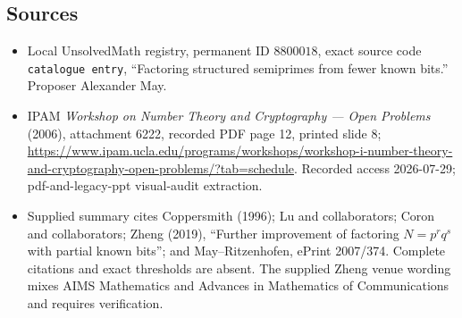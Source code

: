 \documentclass[11pt]{article}
\begin{document}
\subsection{Sources}
\begin{itemize}
\item Local UnsolvedMath registry, permanent ID \(8800018\), exact source code \texttt{catalogue entry}, ``Factoring structured semiprimes from fewer known bits.'' Proposer Alexander May.
\item IPAM \emph{Workshop on Number Theory and Cryptography --- Open Problems} (2006), attachment 6222, recorded PDF page 12, printed slide 8; \url{https://www.ipam.ucla.edu/programs/workshops/workshop-i-number-theory-and-cryptography-open-problems/?tab=schedule}. Recorded access 2026-07-29; pdf-and-legacy-ppt visual-audit extraction.
\item Supplied summary cites Coppersmith (1996); Lu and collaborators; Coron and collaborators; Zheng (2019), ``Further improvement of factoring \(N=p^rq^s\) with partial known bits''; and May--Ritzenhofen, ePrint 2007/374. Complete citations and exact thresholds are absent. The supplied Zheng venue wording mixes AIMS Mathematics and Advances in Mathematics of Communications and requires verification.
\end{itemize}
\end{document}
